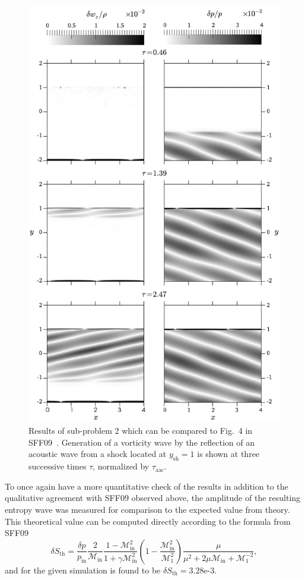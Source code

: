 \begin{figure}
\centering
\includegraphics[width=12cm]{figures/TP2}
\caption {Results of sub-problem 2 which can be compared to Fig.~4 in SFF09~\cite{Sato2009}. Generation of a vorticity wave by the reflection of an acoustic wave from a shock located at $y_{\textrm{sh}}=1$ is shown at three successive times $\tau$, normalized by $\tau_\textrm{aac}$.}
\label{fig:TP2}
\end{figure}

To once again have a more quantitative check of the results in addition to the qualitative agreement with SFF09 observed above, the amplitude of the resulting entropy wave was measured for comparison to the expected value from theory. This theoretical value can be computed directly according to the formula from SFF09
\begin{equation}
\delta S_\textrm{th}=\frac{\delta p}{p_\textrm{in}}\frac{2}{\mathcal{M}_\textrm{in}}\frac{1-\mathcal{M}_\textrm{in}^2}{1+\gamma\mathcal{M}_\textrm{in}^2}\left(1-\frac{\mathcal{M}_\textrm{in}^2}{\mathcal{M}_1^2}\right)\frac{\mu}{\mu^2+2\mu\mathcal{M}_\textrm{in}+\mathcal{M}_1^{-2}},
\end{equation}
and for the given simulation is found to be $\delta S_\textrm{th}=3.28\textrm{e-}3$.


